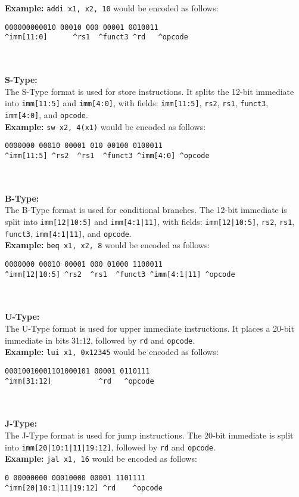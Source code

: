 \documentclass[sigconf]{acmart}
\begin{document}
\textbf{Example:} \texttt{addi x1, x2, 10} would be encoded as follows:
\begin{verbatim}
000000000010 00010 000 00001 0010011
^imm[11:0]      ^rs1  ^funct3 ^rd   ^opcode
\end{verbatim} \\~\\
%
\textbf{S-Type:} \\
The S-Type format is used for store instructions. It splits the 12-bit immediate into \texttt{imm[11:5]} and \texttt{imm[4:0]}, with fields: \texttt{imm[11:5]}, \texttt{rs2}, \texttt{rs1}, \texttt{funct3}, \texttt{imm[4:0]}, and \texttt{opcode}. \\
\textbf{Example:} \texttt{sw x2, 4(x1)} would be encoded as follows:
\begin{verbatim}
0000000 00010 00001 010 00100 0100011
^imm[11:5] ^rs2  ^rs1  ^funct3 ^imm[4:0] ^opcode
\end{verbatim} \\~\\
%
\textbf{B-Type:} \\
The B-Type format is used for conditional branches. The 12-bit immediate is split into \texttt{imm[12|10:5]} and \texttt{imm[4:1|11]}, with fields: \texttt{imm[12|10:5]}, \texttt{rs2}, \texttt{rs1}, \texttt{funct3}, \texttt{imm[4:1|11]}, and \texttt{opcode}. \\
\textbf{Example:} \texttt{beq x1, x2, 8} would be encoded as follows:
\begin{verbatim}
0000000 00010 00001 000 01000 1100011
^imm[12|10:5] ^rs2  ^rs1  ^funct3 ^imm[4:1|11] ^opcode
\end{verbatim} \\~\\
%
\textbf{U-Type:} \\
The U-Type format is used for upper immediate instructions. It places a 20-bit immediate in bits 31:12, followed by \texttt{rd} and \texttt{opcode}. \\
\textbf{Example:} \texttt{lui x1, 0x12345} would be encoded as follows:
\begin{verbatim}
00010010001101000101 00001 0110111
^imm[31:12]           ^rd   ^opcode
\end{verbatim} \\~\\
%
\textbf{J-Type:} \\
The J-Type format is used for jump instructions. The 20-bit immediate is split into \texttt{imm[20|10:1|11|19:12]}, followed by \texttt{rd} and \texttt{opcode}. \\
\textbf{Example:} \texttt{jal x1, 16} would be encoded as follows:
\begin{verbatim}
0 00000000 00010000 00001 1101111
^imm[20|10:1|11|19:12] ^rd    ^opcode
\end{verbatim}
\end{document}
